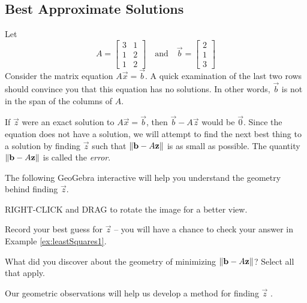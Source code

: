 \documentclass{ximera}
\begin{document}
\subsection*{Best Approximate Solutions}
\begin{exploration}\label{exp:leastSq1}
    Let
    $$A=\begin{bmatrix}3 & 1\\1 & 2\\1 & 2\end{bmatrix}\quad\text{and}\quad \vec{b}=\begin{bmatrix}2\\1\\3\end{bmatrix}$$
    Consider the matrix equation $A\vec{x}=\vec{b}$.
    A quick examination of the last two rows should convince you that this equation has no solutions.  In other words, $\vec{b}$ is not in the span of the columns of $A$.

    If $\vec{z}$ were an exact solution to $A\vec{x}=\vec{b}$, then $\vec{b}-A\vec{z}$ would be $\vec{0}$.  Since the equation does not have a solution, we will attempt to find the next best thing to a solution by finding $\vec{z}$ such that $\left\lVert\mathbf{b}-A\mathbf{z}\right\rVert$ is as small as possible.  The quantity $\left\lVert\mathbf{b}-A\mathbf{z}\right\rVert$ is called the \emph{error}.

    The following GeoGebra interactive will help you understand the geometry behind finding $\vec{z}$.  
    
    RIGHT-CLICK and DRAG to rotate the image for a better view.

\begin{onlineOnly}
\begin{center}
\end{center}
\end{onlineOnly}

 Record your best guess for $\vec{z}$ -- you will have a chance to check your answer in Example \ref{ex:leastSquares1}.

What did you discover about the geometry of minimizing $\left\lVert\mathbf{b}-A\mathbf{z}\right\rVert$? 
Select all that apply.

\begin{selectAll}
\end{selectAll}

Our geometric observations will help us develop a method for finding $\vec{z}$ .  
\end{exploration}
\end{document}
